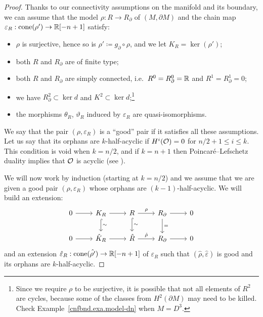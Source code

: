 \begin{proof}
  Thanks to our connectivity assumptions on the manifold and its boundary, we can assume that the model $\rho : R \to R_{\partial}$ of $(M, \partial M)$ and the chain map $\varepsilon_{R} : \operatorname{cone}(\rho') \to \mathbb{R}[-n+1]$ satisfy:
  \begin{itemize}
  \item $\rho$ is surjective, hence so is $\rho' \coloneqq g_{\partial} \circ \rho$, and we let $K_{R} = \ker(\rho')$;
  \item both $R$ and $R_{\partial}$ are of finite type;
  \item both $R$ and $R_{\partial}$ are simply connected, i.e.\ $R^{0} = R_{\partial}^{0} = \mathbb{R}$ and $R^{1} = R_{\partial}^{1} = 0$;
  \item we have $R_{\partial}^{2} \subset \ker d$ and $K^{2} \subset \ker d$;\footnote{Since we require $\rho$ to be surjective, it is possible that not all elements of $R^{2}$ are cycles, because some of the classes from $H^{2}(\partial M)$ may need to be killed. Check Example~\ref{cnfbnd.exa.model-dn} when $M = D^{3}$.}
  \item the morphisms $\theta_{R}$, $\vartheta_{R}$ induced by $\varepsilon_{R}$ are quasi-isomorphisms.
  \end{itemize}

  We say that the pair $(\rho,\varepsilon_{R})$ is a ``good'' pair if it satisfies all these assumptions.
  Let us say that its orphans are $k$-half-acyclic if $H^{i}(\mathcal{O}) = 0$ for $n/2 +1 \leq i \leq k$.
  This condition is void when $k = n/2$, and if $k = n+1$ then Poincaré--Lefschetz duality implies that $\mathcal{O}$ is acyclic (see \cite[Proposition~3.6]{LambrechtsStanley2008}).

  We will now work by induction (starting at $k = n/2$) and we assume that we are given a good pair $(\rho,\varepsilon_{R})$ whose orphans are $(k-1)$-half-acyclic.
  We will build an extension:
  \begin{equation}
    \begin{tikzcd}
      0 \rar
      & K_{R} \rar \dar[hookrightarrow]{\sim}
      & R \rar{\rho} \dar[hookrightarrow]{\sim}
      & R_{\partial} \rar \dar{=}
      & 0
      \\
      0 \rar
      & \hat{K}_{R} \rar
      & \hat{R} \rar{\hat{\rho}}
      & R_{\partial} \rar
      & 0
    \end{tikzcd}
  \end{equation}
  and an extension $\hat{\varepsilon}_{R} : \operatorname{cone}(\hat{\rho'}) \to \mathbb{R}[-n+1]$ of $\varepsilon_{R}$ such that $(\hat{\rho},\hat{\varepsilon})$ is good and its orphans are $k$-half-acyclic.


\end{proof}
